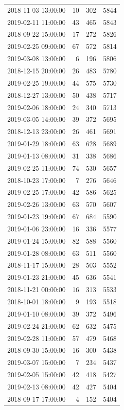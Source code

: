 \begin{tabular}{lrrr}
2018-11-03 13:00:00 & 10 & 302 & 5844 \\
2019-02-11 11:00:00 & 43 & 465 & 5843 \\
2018-09-22 15:00:00 & 17 & 272 & 5826 \\
2019-02-25 09:00:00 & 67 & 572 & 5814 \\
2019-03-08 13:00:00 & 6 & 196 & 5806 \\
2018-12-15 20:00:00 & 26 & 483 & 5780 \\
2019-02-25 19:00:00 & 44 & 575 & 5730 \\
2018-12-27 13:00:00 & 50 & 438 & 5717 \\
2019-02-06 18:00:00 & 24 & 340 & 5713 \\
2019-03-05 14:00:00 & 39 & 372 & 5695 \\
2018-12-13 23:00:00 & 26 & 461 & 5691 \\
2019-01-29 18:00:00 & 63 & 628 & 5689 \\
2019-01-13 08:00:00 & 31 & 338 & 5686 \\
2019-02-25 11:00:00 & 74 & 530 & 5657 \\
2018-10-23 17:00:00 & 7 & 276 & 5646 \\
2019-02-25 17:00:00 & 42 & 586 & 5625 \\
2019-02-26 13:00:00 & 63 & 570 & 5607 \\
2019-01-23 19:00:00 & 67 & 684 & 5590 \\
2019-01-06 23:00:00 & 16 & 336 & 5577 \\
2019-01-24 15:00:00 & 82 & 588 & 5560 \\
2019-01-28 08:00:00 & 63 & 511 & 5560 \\
2018-11-17 15:00:00 & 28 & 503 & 5552 \\
2019-01-23 21:00:00 & 45 & 636 & 5541 \\
2018-11-21 00:00:00 & 16 & 313 & 5533 \\
2018-10-01 18:00:00 & 9 & 193 & 5518 \\
2019-01-10 08:00:00 & 39 & 372 & 5496 \\
2019-02-24 21:00:00 & 62 & 632 & 5475 \\
2019-02-28 11:00:00 & 57 & 479 & 5468 \\
2018-09-30 15:00:00 & 16 & 300 & 5438 \\
2019-03-07 15:00:00 & 7 & 234 & 5437 \\
2019-02-05 15:00:00 & 42 & 418 & 5427 \\
2019-02-13 08:00:00 & 42 & 427 & 5404 \\
2018-09-17 17:00:00 & 4 & 152 & 5404 \\

\end{tabular}
